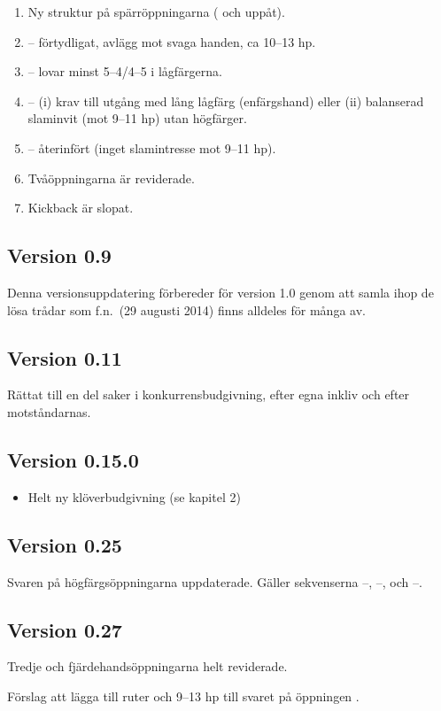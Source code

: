 \begin{enumerate}

\item Ny struktur på spärröppningarna ( och uppåt).

\item {}-- förtydligat, avlägg mot svaga handen, ca 10--13 hp.

\item {}-- lovar minst 5--4/4--5 i lågfärgerna.

\item {}-- (i) krav till utgång med lång lågfärg (enfärgshand)
  eller (ii) balanserad slaminvit (mot 9--11 hp) utan högfärger.

\item {}-- återinfört (inget slamintresse mot 9--11 hp).

\item Tvåöppningarna är reviderade.

\item Kickback är slopat.
\end{enumerate}

\subsection*{Version 0.9}

Denna versionsuppdatering förbereder för version 1.0 genom att samla ihop
de lösa trådar som f.n.\ (29 augusti 2014) finns alldeles för många av.

\subsection*{Version 0.11}

Rättat till en del saker i konkurrensbudgivning, efter egna inkliv och
efter motståndarnas. 

\subsection*{Version 0.15.0}

\begin{itemize}
\item Helt ny klöverbudgivning (se kapitel 2)
\end{itemize}

\subsection*{Version 0.25}

Svaren på högfärgsöppningarna uppdaterade. Gäller sekvenserna
--, --, och --.

\subsection*{Version 0.27}

Tredje och fjärdehandsöppningarna helt reviderade.

Förslag att lägga till ruter och 9--13 hp till svaret  på öppningen .
